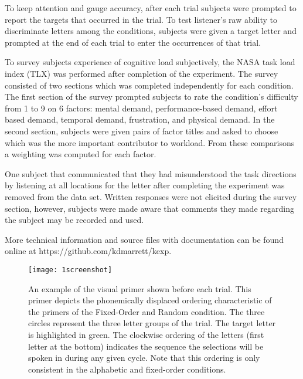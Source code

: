 \documentclass[12pt]{article}
\begin{document}
To keep attention and gauge accuracy, after each trial subjects
were prompted to report the targets that occurred in the trial. To test listener's raw ability
to discriminate letters among the conditions, subjects were given a
target letter and prompted at the end of each trial to enter the
occurrences of that trial.  

To survey subjects experience of cognitive load subjectively, the
NASA task load index (TLX) was performed after completion of the
experiment.  The survey consisted of two sections which was
completed independently for each condition.  The first section of
the survey prompted subjects to rate the condition's difficulty from
1 to 9 on 6 factors: mental demand, performance-based demand, effort
based demand, temporal demand, frustration, and physical demand. In
the second section, subjects were given pairs of factor titles and
asked to choose which was the more important contributor to
workload.  From these comparisons a weighting was computed for each
factor.  


One subject that communicated that they had 
misunderstood the task directions by listening at all locations for
the letter after completing the experiment
was removed from the data set. Written responses were not elicited
during the survey section, however, subjects were made aware that
comments they made regarding the subject may be recorded and used.

More technical information and source files with documentation can
be found online at https://github.com/kdmarrett/kexp.

\begin{figure}[p]
  \centering
  \texttt{[image: 1screenshot]}
  \caption{ An example of the visual primer shown
      before each trial.  This primer depicts the phonemically
      displaced ordering characteristic of the primers of the
      Fixed-Order and Random condition. The three circles represent
  the three letter groups of the trial.  The target letter is
  highlighted in green.  The clockwise ordering of
  the letters (first letter at the bottom) indicates the sequence the selections will be spoken
  in during any given cycle.  Note that this ordering is only
  consistent in the alphabetic and fixed-order conditions.}
  \label{screenshot}
\end{figure}
\end{document}
